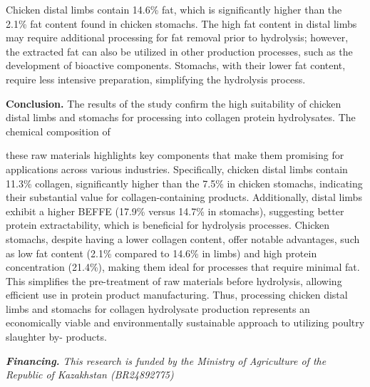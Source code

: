 \begin{multicols}{2}
Chicken distal limbs contain 14.6\% fat, which is significantly higher
than the 2.1\% fat content found in chicken stomachs. The high fat
content in distal limbs may require additional processing for fat
removal prior to hydrolysis; however, the extracted fat can also be
utilized in other production processes, such as the development of
bioactive components. Stomachs, with their lower fat content, require
less intensive preparation, simplifying the hydrolysis process.

{\bfseries Conclusion.} The results of the study confirm the high
suitability of chicken distal limbs and stomachs for processing into
collagen protein hydrolysates. The chemical composition of

these raw materials highlights key components that make them promising
for applications across various industries. Specifically, chicken distal
limbs contain 11.3\% collagen, significantly higher than the 7.5\% in
chicken stomachs, indicating their substantial value for
collagen-containing products. Additionally, distal limbs exhibit a
higher BEFFE (17.9\% versus 14.7\% in stomachs), suggesting better
protein extractability, which is beneficial for hydrolysis processes.
Chicken stomachs, despite having a lower collagen content, offer notable
advantages, such as low fat content (2.1\% compared to 14.6\% in limbs)
and high protein concentration (21.4\%), making them ideal for processes
that require minimal fat. This simplifies the pre-treatment of raw
materials before hydrolysis, allowing efficient use in protein product
manufacturing. Thus, processing chicken distal limbs and stomachs for
collagen hydrolysate production represents an economically viable and
environmentally sustainable approach to utilizing poultry slaughter by-
products.

\emph{{\bfseries Financing.} This research is funded by the Ministry of
Agriculture of the Republic of Kazakhstan (BR24892775)}
\end{multicols}

